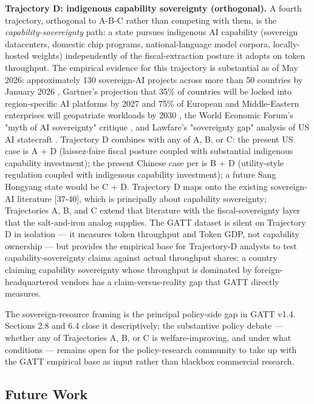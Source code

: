 \documentclass[11pt,a4paper]{article}
\begin{document}
\textbf{Trajectory D: indigenous capability sovereignty (orthogonal).} A fourth trajectory, orthogonal to A-B-C rather than competing with them, is the \emph{capability-sovereignty} path: a state pursues indigenous AI capability (sovereign datacenters, domestic chip programs, national-language model corpora, locally-hosted weights) independently of the fiscal-extraction posture it adopts on token throughput. The empirical evidence for this trajectory is substantial as of May 2026: approximately 130 sovereign-AI projects across more than 50 countries by January 2026 \cite{mit2026sovereignty}, Gartner's projection that 35\% of countries will be locked into region-specific AI platforms by 2027 and 75\% of European and Middle-Eastern enterprises will geopatriate workloads by 2030 \cite{gartner2026regional}, the World Economic Forum's "myth of AI sovereignty" critique \cite{wef2026sovereigntymyth}, and Lawfare's "sovereignty gap" analysis of US AI statecraft \cite{lawfare2026sovereigntygap}. Trajectory D combines with any of A, B, or C: the present US case is A + D (laissez-faire fiscal posture coupled with substantial indigenous capability investment); the present Chinese case per \cite{chinaminutes2026electricity} is B + D (utility-style regulation coupled with indigenous capability investment); a future Sang Hongyang state would be C + D. Trajectory D maps onto the existing sovereign-AI literature [37-40], which is principally about capability sovereignty; Trajectories A, B, and C extend that literature with the fiscal-sovereignty layer that the salt-and-iron analog supplies. The GATT dataset is silent on Trajectory D in isolation --- it measures token throughput and Token GDP, not capability ownership --- but provides the empirical base for Trajectory-D analysts to test capability-sovereignty claims against actual throughput shares: a country claiming capability sovereignty whose throughput is dominated by foreign-headquartered vendors has a claim-versus-reality gap that GATT directly measures.

The sovereign-resource framing is the principal policy-side gap in GATT v1.4. Sections 2.8 and 6.4 close it descriptively; the substantive policy debate --- whether any of Trajectories A, B, or C is welfare-improving, and under what conditions --- remains open for the policy-research community to take up with the GATT empirical base as input rather than blackbox commercial research.

\subsection{Future Work}
\end{document}
